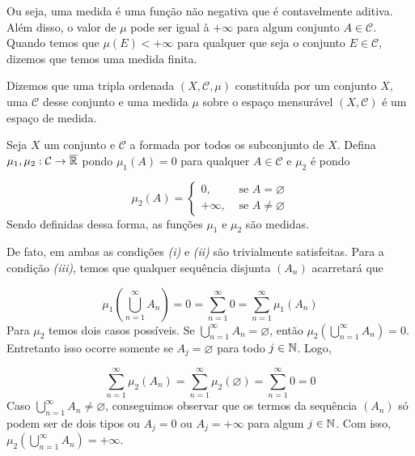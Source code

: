 Ou seja, uma medida é uma função não negativa que é contavelmente aditiva.
Além disso, o valor de $\mu$ pode ser igual à $+\infty$ para algum conjunto $A \in \mathcal{C}$.
Quando temos que $\mu(E) < +\infty$ para qualquer que seja o conjunto $E \in \mathcal{C}$, dizemos que temos uma medida finita.

\begin{definition}
	\label{def:espaço-de-medida}
	Dizemos que uma tripla ordenada $(X, \mathcal{C}, \mu)$ constituída por um conjunto $X$, uma \sigal $\mathcal{C}$ desse conjunto e uma medida $\mu$ sobre o espaço mensurável $(X, \mathcal{C})$ é um espaço de medida.
\end{definition}



\begin{example}
    Seja $X$ um conjunto e $\mathcal{C}$ a \sigal formada por todos os subconjunto de $X$.    
    Defina $\mu_1, \mu_2:\mathcal{C} \to \operatorname{\overline{\mathbb{R}}}$ pondo $\mu_1(A) = 0$ para qualquer  $A \in \mathcal{C}$ e 
    $\mu_2$ é  pondo 

$$\mu_2(A) = \left\{\begin{array}{cc}
0, & \textrm{\ se \ } A = \varnothing \\
+\infty,& \textrm{\ se \ } A \neq \varnothing
\end{array}\right.$$
Sendo definidas dessa forma, as funções $\mu_1$ e $\mu_2$ são medidas.
\end{example}

De fato, em ambas as condições \textit{(i)} e \textit{(ii)} são trivialmente satisfeitas.
Para a condição \textit{(iii)}, temos que qualquer sequência disjunta $(A_n)$ acarretará que

$$\mu_1\left(\bigcup_{n = 1}^\infty A_n\right) = 0 = \sum_{n = 1}^\infty 0 = \sum_{n = 1}^\infty \mu_1(A_n) $$
Para $\mu_2$ temos dois casos possíveis.
Se  $\displaystyle \bigcup_{n = 1}^\infty A_n  = \varnothing$, então $\mu_2\left(\displaystyle \bigcup_{n = 1}^\infty A_n\right) = 0$. Entretanto isso ocorre somente se $A_j = \varnothing$ para todo $j \in \operatorname{\mathbb{N}}$.
Logo, 

$$\sum_{n = 1}^\infty \mu_2(A_n) = \sum_{n = 1}^\infty \mu_2(\varnothing) = \sum_{n = 1}^\infty 0 = 0$$
Caso $\displaystyle \bigcup_{n = 1}^\infty A_n  \neq  \varnothing$, conseguimos observar que os termos da sequência $(A_n)$ só podem ser de dois tipos ou $A_j = 0$ ou $A_j = +\infty$ para algum $j \in \operatorname{\mathbb{N}}$. Com isso,  $\mu_2\left(\displaystyle \bigcup_{n = 1}^\infty A_n\right) = +\infty$.

